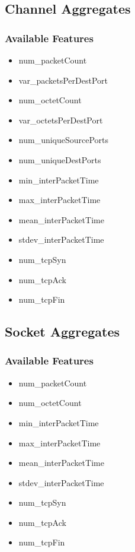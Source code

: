 \documentclass[11pt]{article}
\begin{document}
\subsection{Channel Aggregates}
\subsubsection{Available Features}

\begin{itemize}
	\itemsep0em
	\item num\_packetCount
	\item var\_packetsPerDestPort
	\item num\_octetCount
	\item var\_octetsPerDestPort
	\item num\_uniqueSourcePorts
	\item num\_uniqueDestPorts
	\item min\_interPacketTime
	\item max\_interPacketTime
	\item mean\_interPacketTime
	\item stdev\_interPacketTime
	\item num\_tcpSyn
	\item num\_tcpAck
	\item num\_tcpFin
\end{itemize}

\subsection{Socket Aggregates}
\subsubsection{Available Features}

\begin{itemize}
	\itemsep0em
	\item num\_packetCount
	\item num\_octetCount
	\item min\_interPacketTime
	\item max\_interPacketTime
	\item mean\_interPacketTime
	\item stdev\_interPacketTime
	\item num\_tcpSyn
	\item num\_tcpAck
	\item num\_tcpFin
\end{itemize}
\end{document}
